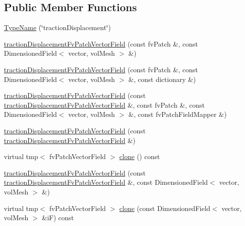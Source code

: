 \subsection*{Public Member Functions}
\begin{DoxyCompactItemize}
\item 
\hyperlink{classFoam_1_1tractionDisplacementFvPatchVectorField_a79c6de0239efffaabca05f8267fd1352}{Type\+Name} (\char`\"{}traction\+Displacement\char`\"{})
\item 
\hyperlink{classFoam_1_1tractionDisplacementFvPatchVectorField_ac7250c3f719a062396a386a9d61bc08f}{traction\+Displacement\+Fv\+Patch\+Vector\+Field} (const fv\+Patch \&, const Dimensioned\+Field$<$ vector, vol\+Mesh $>$ \&)
\item 
\hyperlink{classFoam_1_1tractionDisplacementFvPatchVectorField_aecb75d2de968c1c9574ee67910718b7d}{traction\+Displacement\+Fv\+Patch\+Vector\+Field} (const fv\+Patch \&, const Dimensioned\+Field$<$ vector, vol\+Mesh $>$ \&, const dictionary \&)
\item 
\hyperlink{classFoam_1_1tractionDisplacementFvPatchVectorField_a3649d18b9636dd20240aba59660b14b2}{traction\+Displacement\+Fv\+Patch\+Vector\+Field} (const \hyperlink{classFoam_1_1tractionDisplacementFvPatchVectorField}{traction\+Displacement\+Fv\+Patch\+Vector\+Field} \&, const fv\+Patch \&, const Dimensioned\+Field$<$ vector, vol\+Mesh $>$ \&, const fv\+Patch\+Field\+Mapper \&)
\item 
\hyperlink{classFoam_1_1tractionDisplacementFvPatchVectorField_a8eb5f2b6ca51b0a71e3d8e3892b640e2}{traction\+Displacement\+Fv\+Patch\+Vector\+Field} (const \hyperlink{classFoam_1_1tractionDisplacementFvPatchVectorField}{traction\+Displacement\+Fv\+Patch\+Vector\+Field} \&)
\item 
virtual tmp$<$ fv\+Patch\+Vector\+Field $>$ \hyperlink{classFoam_1_1tractionDisplacementFvPatchVectorField_af0f4bc68c73acc08f11adb3a8957d875}{clone} () const
\item 
\hyperlink{classFoam_1_1tractionDisplacementFvPatchVectorField_a0d43f0b1ec01e7c440cf50a7efa41532}{traction\+Displacement\+Fv\+Patch\+Vector\+Field} (const \hyperlink{classFoam_1_1tractionDisplacementFvPatchVectorField}{traction\+Displacement\+Fv\+Patch\+Vector\+Field} \&, const Dimensioned\+Field$<$ vector, vol\+Mesh $>$ \&)
\item 
virtual tmp$<$ fv\+Patch\+Vector\+Field $>$ \hyperlink{classFoam_1_1tractionDisplacementFvPatchVectorField_a089f8c8dc7161cb741c2b911efc67d76}{clone} (const Dimensioned\+Field$<$ vector, vol\+Mesh $>$ \&iF) const

\end{DoxyCompactItemize}
